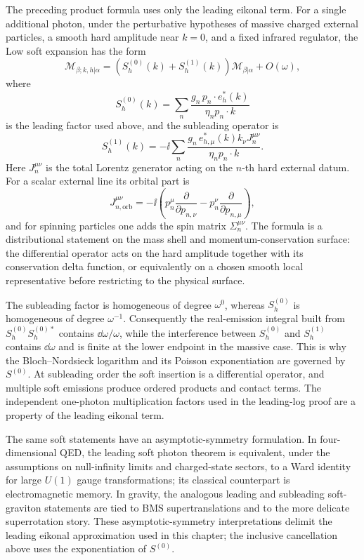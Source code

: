 \begin{remark}
The preceding product formula uses only the leading eikonal term.  For a
single additional photon, under the perturbative hypotheses of massive charged
external particles, a smooth hard amplitude near \(k=0\), and a fixed
infrared regulator, the Low soft expansion has the form
\[
  \mathcal M_{\beta;k,h|\alpha}
  =
  \left(S_h^{(0)}(k)+S_h^{(1)}(k)\right)
  \mathcal M_{\beta|\alpha}
  +O(\omega),
\]
where
\[
  S_h^{(0)}(k)
  =
  \sum_n
  \frac{g_n\,p_n\cdot e_h^*(k)}
       {\eta_n p_n\cdot k}
\]
is the leading factor used above, and the subleading operator is
\[
  S_h^{(1)}(k)
  =
  -\ii\sum_n
  \frac{g_n\,e^*_{h,\mu}(k)k_\nu J_n^{\mu\nu}}
       {\eta_n p_n\cdot k}.
\]
Here \(J_n^{\mu\nu}\) is the total Lorentz generator acting on the \(n\)-th
hard external datum.  For a scalar external line its orbital part is
\[
  J_{n,\mathrm{orb}}^{\mu\nu}
  =
  -\ii\left(
    p_n^\mu\frac{\partial}{\partial p_{n,\nu}}
    -
    p_n^\nu\frac{\partial}{\partial p_{n,\mu}}
  \right),
\]
and for spinning particles one adds the spin matrix
\(\Sigma_n^{\mu\nu}\).  The formula is a distributional statement on the
mass shell and momentum-conservation surface: the differential operator acts
on the hard amplitude together with its conservation delta function, or
equivalently on a chosen smooth local representative before restricting to the
physical surface.

The subleading factor is homogeneous of degree \(\omega^0\), whereas
\(S_h^{(0)}\) is homogeneous of degree \(\omega^{-1}\).  Consequently the
real-emission integral built from \(S_h^{(0)}S_h^{(0)*}\) contains
\(\dd\omega/\omega\), while the interference between \(S_h^{(0)}\) and
\(S_h^{(1)}\) contains \(\dd\omega\) and is finite at the lower endpoint in
the massive case.  This is why the Bloch--Nordsieck logarithm and its Poisson
exponentiation are governed by \(S^{(0)}\).  At subleading order the soft
insertion is a differential operator, and multiple soft emissions produce
ordered products and contact terms.  The independent one-photon
multiplication factors used in the leading-log proof are a property of the
leading eikonal term.

The same soft statements have an asymptotic-symmetry formulation.  In
four-dimensional QED, the leading soft photon theorem is equivalent, under
the assumptions on null-infinity limits and charged-state sectors, to a Ward
identity for large \(U(1)\) gauge transformations; its classical counterpart
is electromagnetic memory.  In gravity, the analogous leading and subleading
soft-graviton statements are tied to BMS supertranslations and to the more
delicate superrotation story.  These asymptotic-symmetry interpretations
delimit the leading eikonal approximation used in this chapter; the inclusive
cancellation above uses the exponentiation of \(S^{(0)}\).
\end{remark}


